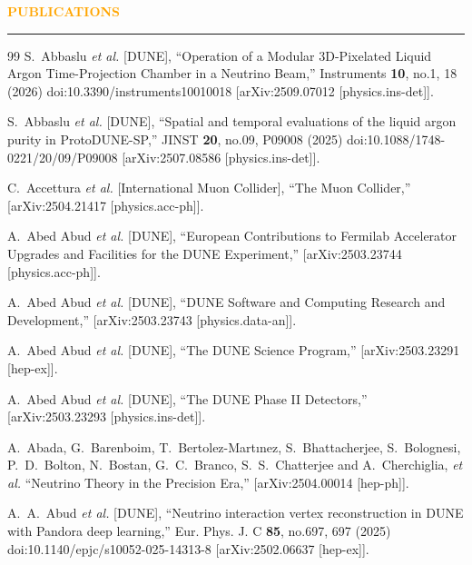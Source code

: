 \documentclass{resume} %
\renewenvironment{rSection}[1]{
\sectionskip
\textcolor{Orange}{\bfseries\MakeUppercase{#1}}
\sectionlineskip
\hrule
\begin{list}{}{
\setlength{\leftmargin}{1.5em}
}
\item[]
}{
\end{list}
}
\begin{document}
\begin{rSection}{ Publications}
\begin{thebibliography}{99}
S.~Abbaslu \textit{et al.} [DUNE],
``Operation of a Modular 3D-Pixelated Liquid Argon Time-Projection Chamber in a Neutrino Beam,''
Instruments \textbf{10}, no.1, 18 (2026)
doi:10.3390/instruments10010018
[arXiv:2509.07012 [physics.ins-det]].

S.~Abbaslu \textit{et al.} [DUNE],
``Spatial and temporal evaluations of the liquid argon purity in ProtoDUNE-SP,''
JINST \textbf{20}, no.09, P09008 (2025)
doi:10.1088/1748-0221/20/09/P09008
[arXiv:2507.08586 [physics.ins-det]].

C.~Accettura \textit{et al.} [International Muon Collider],
``The Muon Collider,''
[arXiv:2504.21417 [physics.acc-ph]].

A.~Abed Abud \textit{et al.} [DUNE],
``European Contributions to Fermilab Accelerator Upgrades and Facilities for the DUNE Experiment,''
[arXiv:2503.23744 [physics.acc-ph]].

A.~Abed Abud \textit{et al.} [DUNE],
``DUNE Software and Computing Research and Development,''
[arXiv:2503.23743 [physics.data-an]].

A.~Abed Abud \textit{et al.} [DUNE],
``The DUNE Science Program,''
[arXiv:2503.23291 [hep-ex]].

A.~Abed Abud \textit{et al.} [DUNE],
``The DUNE Phase II Detectors,''
[arXiv:2503.23293 [physics.ins-det]].

A.~Abada, G.~Barenboim, T.~Bertolez-Mart{\i}nez, S.~Bhattacherjee, S.~Bolognesi, P.~D.~Bolton, N.~Bostan, G.~C.~Branco, S.~S.~Chatterjee and A.~Cherchiglia, \textit{et al.}
``Neutrino Theory in the Precision Era,''
[arXiv:2504.00014 [hep-ph]].

A.~A.~Abud \textit{et al.} [DUNE],
``Neutrino interaction vertex reconstruction in DUNE with Pandora deep learning,''
Eur. Phys. J. C \textbf{85}, no.697, 697 (2025)
doi:10.1140/epjc/s10052-025-14313-8
[arXiv:2502.06637 [hep-ex]].


\end{thebibliography}
\end{rSection}
\end{document}
